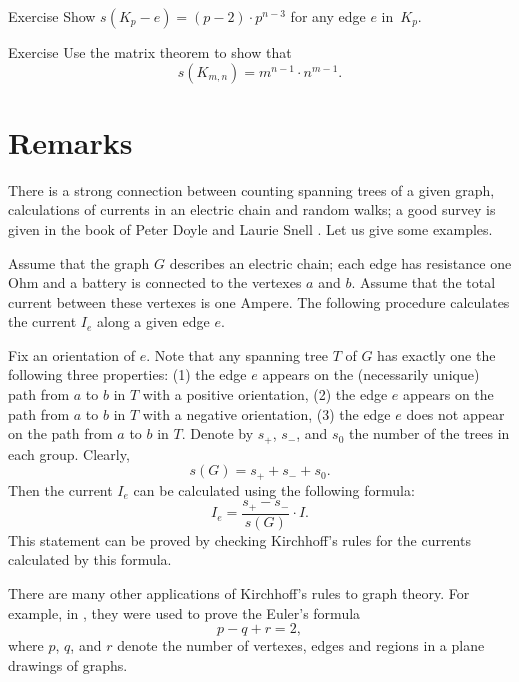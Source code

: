 \begin{thm}{Exercise}
Show $s(K_p-e)=(p-2)\cdot p^{n-3}$ for any edge $e$ in~$K_p$. 
\end{thm}

\begin{thm}{Exercise}
Use the matrix theorem to show that 
\[s(K_{m,n})=m^{n-1}\cdot n^{m-1}.\]
\end{thm}



\section*{Remarks}

There is a strong connection between counting spanning trees of a given graph,
calculations of currents in an electric chain 
and random walks; a good survey is given in the book of Peter Doyle and Laurie Snell \cite{doyle-snell}. Let us give some examples.

Assume that the graph $G$ describes an electric chain;
each edge has resistance one Ohm and a battery is connected to the vertexes $a$ and $b$.
Assume that the total current between these vertexes is one Ampere.
The following procedure calculates the current $I_e$ along a given edge $e$.

Fix an orientation of $e$.
Note that any spanning tree $T$ of $G$ has exactly one the following three properties:
(1) the edge $e$ appears on the (necessarily unique) path from $a$ to $b$ in $T$ with a positive orientation,
(2) the edge $e$ appears on the path from $a$ to $b$ in $T$ with a negative orientation,
(3) the edge $e$ does not appear on the path from $a$ to $b$ in $T$.
Denote by $s_+$, $s_-$, and $s_0$ the number of the trees in each group.
Clearly,
\[s(G)=s_++s_-+s_0.\]
Then  the current $I_e$ can be calculated using the following formula:
\[I_e=\frac{s_+-s_-}{s(G)}\cdot I.\]
This statement can be proved by checking Kirchhoff's rules for the currents calculated by this formula.

There are many other applications of Kirchhoff's rules to graph theory.
For example, in \cite{levi}, they were used to prove the Euler's formula
\[p-q+r=2,\]
where $p$, $q$, and $r$ denote the number of vertexes, edges and regions in a plane drawings of graphs.



